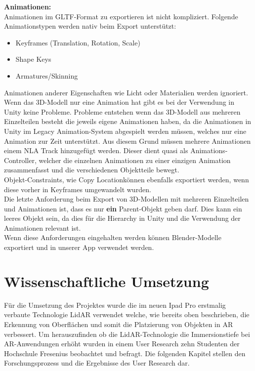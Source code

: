 \documentclass[titlepage, a4paper, 11pt]{scrartcl}
\begin{document}
  \textbf{Animationen:}\\
  Animationen im GLTF-Format zu exportieren ist nicht kompliziert. Folgende Animationstypen werden nativ beim Export unterstützt:
  \begin{itemize}
  \item Keyframes (Translation, Rotation, Scale)
  \item Shape Keys
  \item Armatures/Skinning
  \end{itemize}
  Animationen anderer Eigenschaften wie Licht oder Materialien werden ignoriert.\\
  Wenn das 3D-Modell nur eine Animation hat gibt es bei der Verwendung in Unity keine Probleme. Probleme entstehen wenn das 3D-Modell aus mehreren Einzelteilen besteht die jeweils eigene Animationen haben, da die Animationen in Unity im Legacy Animation-System abgespielt werden müssen, welches nur eine Animation zur Zeit unterstützt. Aus diesem Grund müssen mehrere Animationen einem NLA Track hinzugefügt werden. Dieser dient quasi als Animations-Controller, welcher die einzelnen Animationen zu einer einzigen Animation zusammenfasst und die verschiedenen Objektteile bewegt.\\
  Objekt-Constraints, wie \glqq Copy Location\grqq können ebenfalls exportiert werden, wenn diese vorher in Keyframes umgewandelt wurden.\\
  Die letzte Anforderung beim Export von 3D-Modellen mit mehreren Einzelteilen und Animationen ist, dass es nur \textbf{ein} Parent-Objekt geben darf. Dies kann ein leeres Objekt sein, da dies für die Hierarchy in Unity und die Verwendung der Animationen relevant ist.\\

  Wenn diese Anforderungen eingehalten werden können Blender-Modelle exportiert und in unserer App verwendet werden.
  \section{Wissenschaftliche Umsetzung}
  Für die Umsetzung des Projektes wurde die im neuen Ipad Pro erstmalig verbaute Technologie LidAR verwendet welche, wie bereits oben beschrieben, die Erkennung von Oberflächen und somit die Platzierung von Objekten in AR verbessert. Um herauszufinden ob die LidAR-Technologie die Immersionstiefe bei AR-Anwendungen erhöht wurden in einem User Research zehn Studenten der Hochschule Fresenius beobachtet und befragt. Die folgenden Kapitel stellen den Forschungsprozess und die Ergebnisse des User Research dar.
\end{document}
